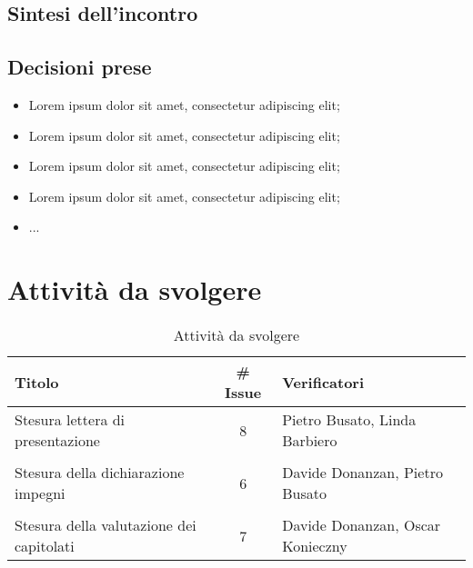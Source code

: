 \subsection{Sintesi dell'incontro}
\lipsum[1] %
\subsection{Decisioni prese}
\begin{itemize}
	\setlength\itemsep{0em}
	\item Lorem ipsum dolor sit amet, consectetur adipiscing elit;
	\item Lorem ipsum dolor sit amet, consectetur adipiscing elit;
	\item Lorem ipsum dolor sit amet, consectetur adipiscing elit;
	\item Lorem ipsum dolor sit amet, consectetur adipiscing elit;
	\item ...
\end{itemize}
\section{Attività da svolgere}
\begin{table}[ht!]
	\centering
	\begin{tabular}{lcl}
		\toprule
		\textbf{Titolo} & \textbf{\# Issue} & \textbf{Verificatori} \\
		\midrule
		Stesura lettera di presentazione & 8 & Pietro Busato, Linda Barbiero\\\\
		Stesura della dichiarazione impegni  &  6 & Davide Donanzan, Pietro Busato \\\\
		Stesura della valutazione dei capitolati & 7 & Davide Donanzan, Oscar Konieczny \\
		\bottomrule
	\end{tabular}
	\caption{Attività da svolgere}
	\label{table:Attivita da svolgere}
\end{table}


